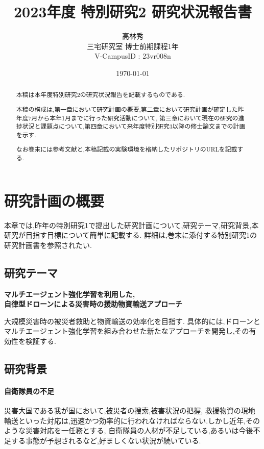 \documentclass{article}[jsarticle]
\title{2023年度 特別研究2 研究状況報告書}
\author{高林秀 \\ 三宅研究室 博士前期課程1年 \\ V-CampusID : 23vr008n}
\date{\today}
\begin{document}
\maketitle

\begin{abstract}
    本稿は本年度特別研究2の研究状況報告を記載するものである.\par
    本稿の構成は,第一章において研究計画の概要,第二章において研究計画が確定した昨年度7月から本年1月までに行った研究活動について,
    第三章において現在の研究の進捗状況と課題点について,第四章において来年度特別研究3以降の修士論文までの計画を示す.\par 
    なお巻末には参考文献と,本稿記載の実験環境を格納したリポジトリのURLを記載する.
\end{abstract}



\tableofcontents


\section{研究計画の概要}
本章では,昨年の特別研究1で提出した研究計画について,研究テーマ,研究背景,本研究が目指す目標について簡単に記載する.
詳細は,巻末に添付する特別研究1の研究計画書を参照されたい.
\subsection{研究テーマ}
    \centerline{
        \textbf{マルチエージェント強化学習を利用した,} \\
        \textbf{自律型ドローンによる災害時の援助物資輸送アプローチ}
    }

    大規模災害時の被災者救助と物資輸送の効率化を目指す.
    具体的には,ドローンとマルチエージェント強化学習を組み合わせた新たなアプローチを開発し,その有効性を検証する.
\subsection{研究背景}
\paragraph{自衛隊員の不足} \par 

災害大国である我が国において,被災者の捜索,被害状況の把握,
救援物資の現地輸送といった対応は,迅速かつ効率的に行われなければならない.しかし近年,そのような災害対応を一任務とする,
自衛隊員の人材が不足している,あるいは今後不足する事態が予想されるなど,好ましくない状況が続いている.
\end{document}
